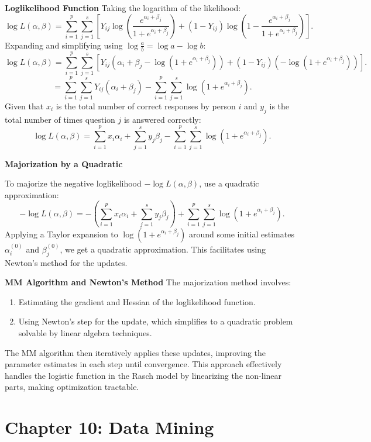 \documentclass[8pt]{article}
\begin{document}
{\textbf{Loglikelihood Function}
Taking the logarithm of the likelihood:
\[
\log L(\alpha, \beta) = \sum_{i=1}^p \sum_{j=1}^s \left[ Y_{ij} \log \left(\frac{e^{\alpha_i + \beta_j}}{1 + e^{\alpha_i + \beta_j}}\right) + (1 - Y_{ij}) \log \left(1 - \frac{e^{\alpha_i + \beta_j}}{1 + e^{\alpha_i + \beta_j}}\right) \right].
\]
Expanding and simplifying using \(\log \frac{a}{b} = \log a - \log b\):
\[
\log L(\alpha, \beta) = \sum_{i=1}^p \sum_{j=1}^s \left[ Y_{ij} (\alpha_i + \beta_j - \log(1 + e^{\alpha_i + \beta_j})) + (1 - Y_{ij}) (-\log(1 + e^{\alpha_i + \beta_j})) \right].
\]
\[
= \sum_{i=1}^p \sum_{j=1}^s Y_{ij} (\alpha_i + \beta_j) - \sum_{i=1}^p \sum_{j=1}^s \log(1 + e^{\alpha_i + \beta_j}).
\]
Given that \(x_i\) is the total number of correct responses by person \(i\) and \(y_j\) is the total number of times question \(j\) is answered correctly:
\[
\log L(\alpha, \beta) = \sum_{i=1}^p x_i \alpha_i + \sum_{j=1}^s y_j \beta_j - \sum_{i=1}^p \sum_{j=1}^s \log(1 + e^{\alpha_i + \beta_j}).
\]

\textbf{Majorization by a Quadratic}

To majorize the negative loglikelihood \(-\log L(\alpha, \beta)\), use a quadratic approximation:
\[
-\log L(\alpha, \beta) = -\left(\sum_{i=1}^p x_i \alpha_i + \sum_{j=1}^s y_j \beta_j\right) + \sum_{i=1}^p \sum_{j=1}^s \log(1 + e^{\alpha_i + \beta_j}).
\]
Applying a Taylor expansion to \(\log(1 + e^{\alpha_i + \beta_j})\) around some initial estimates \(\alpha_i^{(0)}\) and \(\beta_j^{(0)}\), we get a quadratic approximation. This facilitates using Newton's method for the updates.

\textbf{MM Algorithm and Newton's Method}
The majorization method involves:
\begin{enumerate}
    \item Estimating the gradient and Hessian of the loglikelihood function.
    \item Using Newton’s step for the update, which simplifies to a quadratic problem solvable by linear algebra techniques.
\end{enumerate}

The MM algorithm then iteratively applies these updates, improving the parameter estimates in each step until convergence. This approach effectively handles the logistic function in the Rasch model by linearizing the non-linear parts, making optimization tractable.

\newpage
\section*{Chapter 10: Data Mining}

}
\end{document}

